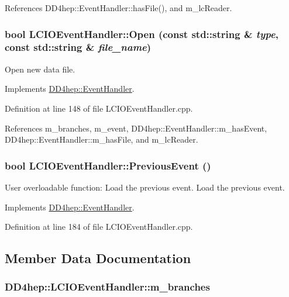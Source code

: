 References DD4hep::EventHandler::hasFile(), and m\_\-lcReader.\hypertarget{class_d_d4hep_1_1_l_c_i_o_event_handler_a67214b5a7675de7d634ac7c1d0cd2c7c}{
\subsubsection[{Open}]{\setlength{\rightskip}{0pt plus 5cm}bool LCIOEventHandler::Open (const std::string \& {\em type}, \/  const std::string \& {\em file\_\-name})}}
\label{class_d_d4hep_1_1_l_c_i_o_event_handler_a67214b5a7675de7d634ac7c1d0cd2c7c}


Open new data file. 

Implements \hyperlink{class_d_d4hep_1_1_event_handler_a90995d3b610beee9d9f7fafcc060626b}{DD4hep::EventHandler}.

Definition at line 148 of file LCIOEventHandler.cpp.

References m\_\-branches, m\_\-event, DD4hep::EventHandler::m\_\-hasEvent, DD4hep::EventHandler::m\_\-hasFile, and m\_\-lcReader.\hypertarget{class_d_d4hep_1_1_l_c_i_o_event_handler_a178458d67dd58d3f5d701795fcadcd2e}{
\subsubsection[{PreviousEvent}]{\setlength{\rightskip}{0pt plus 5cm}bool LCIOEventHandler::PreviousEvent ()}}
\label{class_d_d4hep_1_1_l_c_i_o_event_handler_a178458d67dd58d3f5d701795fcadcd2e}


User overloadable function: Load the previous event. Load the previous event. 

Implements \hyperlink{class_d_d4hep_1_1_event_handler_a0942608bebbdd107c9dedbdc7311791f}{DD4hep::EventHandler}.

Definition at line 184 of file LCIOEventHandler.cpp.

\subsection{Member Data Documentation}
\hypertarget{class_d_d4hep_1_1_l_c_i_o_event_handler_affa8da5c2619446e0e5c5cf9d4ad3d69}{
\subsubsection[{m\_\-branches}]{ {\bf DD4hep::LCIOEventHandler::m\_\-branches}}}
\label{class_d_d4hep_1_1_l_c_i_o_event_handler_affa8da5c2619446e0e5c5cf9d4ad3d69}


